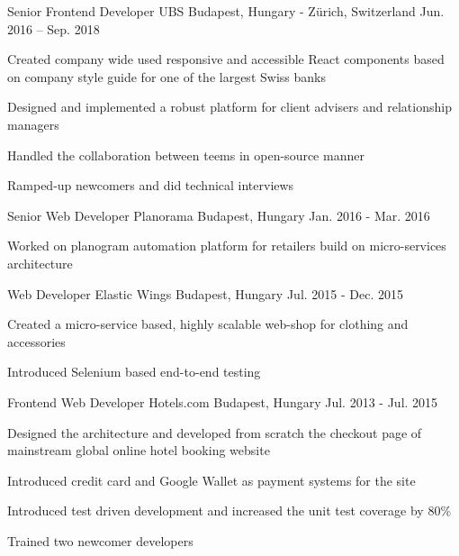 \begin{cventries}
  \cventry
    {Senior Frontend Developer} %
    {UBS} %
    {Budapest, Hungary - Zürich, Switzerland} %
    {Jun. 2016 – Sep. 2018} %
    {
      \begin{cvitems} %
        \item {Created company wide used responsive and accessible React components based on company style guide for one of the largest Swiss banks}
        \item {Designed and implemented a robust platform for client advisers and relationship managers}
        \item {Handled the collaboration between teems in open-source manner}
        \item {Ramped-up newcomers and did technical interviews}
      \end{cvitems}
    }

  \cventry
    {Senior Web Developer} %
    {Planorama} %
    {Budapest, Hungary} %
    {Jan. 2016 - Mar. 2016} %
    {
      \begin{cvitems} %
        \item {Worked on planogram automation platform for retailers build on micro-services architecture}
      \end{cvitems}
    }

  \cventry
    {Web Developer} %
    {Elastic Wings} %
    {Budapest, Hungary} %
    {Jul. 2015 - Dec. 2015} %
    {
      \begin{cvitems} %
        \item {Created a micro-service based, highly scalable web-shop for clothing and accessories}
        \item {Introduced Selenium based end-to-end testing}
      \end{cvitems}
    }

  \cventry
    {Frontend Web Developer} %
    {Hotels.com} %
    {Budapest, Hungary} %
    {Jul. 2013 - Jul. 2015} %
    {
      \begin{cvitems} %
        \item {Designed the architecture and developed from scratch the checkout page of mainstream global online hotel booking website}
        \item {Introduced credit card and Google Wallet as payment systems for the site}
        \item {Introduced test driven development and increased the unit test coverage by 80\%}
        \item {Trained two newcomer developers}
      \end{cvitems}
    }


\end{cventries}
